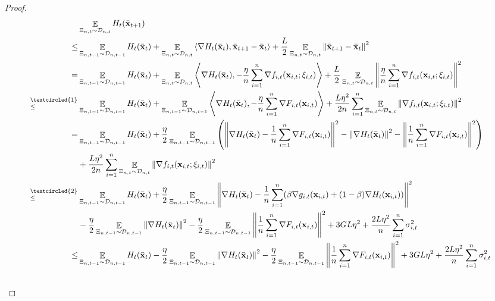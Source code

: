 \documentclass{article}
\begin{document}
\begin{proof}

\begin{align}
\nonumber
& \EE_{ \Xi_{n,t} \sim \Dcal_{n,t} } H_t(\bar{\x}_{t+1}) \\ \nonumber
\le & \EE_{ \Xi_{n,t-1} \sim \Dcal_{n,t-1} } H_t(\bar{\x}_t) + \EE_{ \Xi_{n,t} \sim \Dcal_{n,t} }\lrangle{\nabla H_t(\bar{\x}_t), \bar{\x}_{t+1} - \bar{\x}_t} + \frac{L}{2}\EE_{ \Xi_{n,t} \sim \Dcal_{n,t} }\lrnorm{\bar{\x}_{t+1} - \bar{\x}_t}^2 \\ \nonumber
= & \EE_{ \Xi_{n,t-1} \sim \Dcal_{n,t-1} } H_t(\bar{\x}_t) + \EE_{ \Xi_{n,t} \sim \Dcal_{n,t} }\lrangle{\nabla H_t(\bar{\x}_t), -\frac{\eta}{n}\sum_{i=1}^n \nabla f_{i,t}(\x_{i,t};\xi_{i,t})} + \frac{L}{2} \EE_{ \Xi_{n,t} \sim \Dcal_{n,t} }\lrnorm{\frac{\eta}{n}\sum_{i=1}^n \nabla f_{i,t}(\x_{i,t};\xi_{i,t})}^2 \\ \nonumber
\refabovecir{\le}{\textcircled{1}} & \EE_{ \Xi_{n,t-1} \sim \Dcal_{n,t-1} } H_t(\bar{\x}_t) + \EE_{ \Xi_{n,t-1} \sim \Dcal_{n,t-1} } \lrangle{\nabla H_t(\bar{\x}_t), -\frac{\eta}{n}\sum_{i=1}^n \nabla F_{i,t}(\x_{i,t})} + \frac{L\eta^2}{2n}\sum_{i=1}^n\EE_{ \Xi_{n,t} \sim \Dcal_{n,t} }\lrnorm{ \nabla f_{i,t}(\x_{i,t};\xi_{i,t})}^2 \\ \nonumber
= & \EE_{ \Xi_{n,t-1} \sim \Dcal_{n,t-1} } H_t(\bar{\x}_t) + \frac{\eta}{2}\EE_{ \Xi_{n,t-1} \sim \Dcal_{n,t-1} } \lrincir{ \lrnorm{\nabla H_t(\bar{\x}_t) -\frac{1}{n}\sum_{i=1}^n \nabla F_{i,t}(\x_{i,t})}^2 - \lrnorm{\nabla H_t(\bar{\x}_t)}^2 - \lrnorm{\frac{1}{n}\sum_{i=1}^n \nabla F_{i,t}(\x_{i,t})}^2 } \\ \nonumber 
& + \frac{L\eta^2}{2n}\sum_{i=1}^n\EE_{ \Xi_{n,t} \sim \Dcal_{n,t} }\lrnorm{ \nabla f_{i,t}(\x_{i,t};\xi_{i,t})}^2 \\ \nonumber
\refabovecir{\le}{\textcircled{2}} & \EE_{ \Xi_{n,t-1} \sim \Dcal_{n,t-1} } H_t(\bar{\x}_t) + \frac{\eta}{2}\EE_{ \Xi_{n,t-1} \sim \Dcal_{n,t-1} } \lrnorm{\nabla H_t(\bar{\x}_t) -\frac{1}{n}\sum_{i=1}^n (\beta \nabla g_{i,t}(\x_{i,t}) + (1-\beta)\nabla H_t(\x_{i,t}))}^2 \\ \nonumber 
& - \frac{\eta}{2}\EE_{ \Xi_{n,t-1} \sim \Dcal_{n,t-1} } \lrnorm{\nabla H_t(\bar{\x}_t)}^2 - \frac{\eta}{2}\EE_{ \Xi_{n,t-1} \sim \Dcal_{n,t-1} } \lrnorm{\frac{1}{n}\sum_{i=1}^n \nabla F_{i,t}(\x_{i,t})}^2 + 3GL\eta^2  + \frac{2L\eta^2}{n}\sum_{i=1}^n \sigma_{i,t}^2 \\ \nonumber
\le & \EE_{ \Xi_{n,t-1} \sim \Dcal_{n,t-1} } H_t(\bar{\x}_t) - \frac{\eta}{2}\EE_{ \Xi_{n,t-1} \sim \Dcal_{n,t-1} }\lrnorm{\nabla H_t(\bar{\x}_t)}^2 - \frac{\eta}{2}\EE_{ \Xi_{n,t-1} \sim \Dcal_{n,t-1} }\lrnorm{\frac{1}{n}\sum_{i=1}^n \nabla F_{i,t}(\x_{i,t})}^2  + 3GL\eta^2  + \frac{2L\eta^2}{n}\sum_{i=1}^n \sigma_{i,t}^2 \\ \nonumber

\end{align}
\end{proof}
\end{document}
